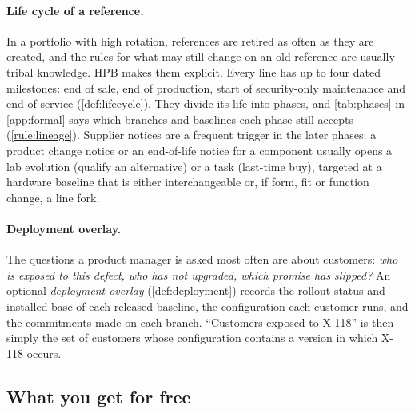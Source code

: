 \paragraph{Life cycle of a reference.}
In a portfolio with high rotation, references are retired as often as
they are created, and the rules for what may still change on an old
reference are usually tribal knowledge. HPB makes them explicit. Every
line has up to four dated milestones: end of sale, end of production,
start of security-only maintenance and end of service
(\cref{def:lifecycle}). They divide its life into phases, and
\cref{tab:phases} in \cref{app:formal} says which branches and baselines
each phase still accepts (\cref{rule:lineage}). Supplier notices are a frequent trigger in
the later phases: a product change notice or an end-of-life notice for a
component usually opens a lab evolution (qualify an alternative) or a task
(last-time buy), targeted at a hardware baseline that is either
interchangeable or, if form, fit or function change, a line fork.


\paragraph{Deployment overlay.}
The questions a product manager is asked most often are about customers:
\emph{who is exposed to this defect, who has not upgraded, which promise
has slipped?} An optional \emph{deployment overlay} (\cref{def:deployment})
records the rollout status and installed base of each released baseline,
the configuration each customer runs, and the commitments made on each
branch. ``Customers exposed to X-118'' is then simply the set of customers
whose configuration contains a version in which X-118 occurs.

\subsection{What you get for free}
\label{sec:model-free}

